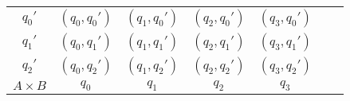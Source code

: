 \begin{table}[H]
\centering
\begin{tabular}{c!{\vrule width 0.8pt}
>{}ccc 
>{}ccc }
$q_0'$ & $(q_0,q_0')$ & $(q_1,q_0')$ & $(q_2,q_0')$ & $(q_3,q_0')$\\
$q_1'$ & $(q_0,q_1')$ & $(q_1,q_1')$ & $(q_2,q_1')$ & $(q_3,q_1')$\\
$q_2'$ & $(q_0,q_2')$ & $(q_1,q_2')$ & $(q_2,q_2')$ & $(q_3,q_2')$\\
$A\times B$ & $q_0$ & $q_1$ & $q_2$ & $q_3$\\
\end{tabular}
\end{table}